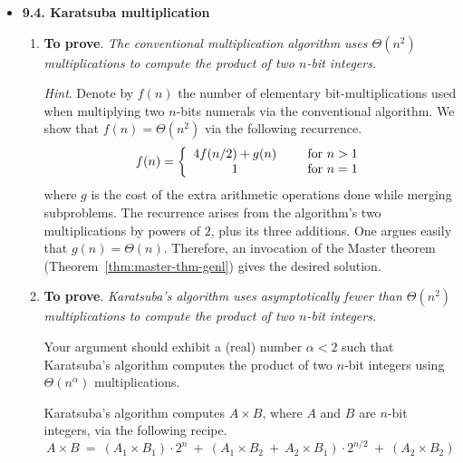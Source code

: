 \begin{itemize}
\item
{\bf 9.4. Karatsuba multiplication} 

\smallskip

\begin{enumerate}
\item 
{\bf To prove}.
{\em The conventional multiplication algorithm uses $\Theta(n^2)$ multiplications to compute the product of two $n$-bit integers.}

\medskip

{\em Hint}.  Denote by $f(n)$ the number of elementary bit-multiplications used when multiplying two $n$-bits numerals via the conventional algorithm.  We show that $f(n) = \Theta(n^2)$ via the following recurrence.
\[ f(n) = \left\{
\begin{array}{cl}
4 f(n/2) + g(n) & \hspace*{.2in} \mbox{for } n > 1 \\
                    1 & \hspace*{.2in} \mbox{for } n = 1
\end{array}
\right. \]
where $g$ is the cost of the extra arithmetic operations done while merging subproblems.  The recurrence arises from the algorithm's two multiplications by powers of $2$, plus its three additions.  One argues easily that $g(n) = \Theta(n)$.  Therefore, an invocation of the Master theorem (Theorem~\ref{thm:master-thm-genl}) gives the desired solution. 

\medskip\item
{\bf To prove}.
{\em Karatsuba's algorithm uses {\em asymptotically fewer than} $\Theta(n^2)$ multiplications to compute the product of two $n$-bit integers.}

\smallskip

Your argument should exhibit a (real) number $\alpha < 2$ such that Karatsuba's algorithm computes the product of two $n$-bit integers using $\Theta(n^\alpha)$ multiplications.

\medskip

Karatsuba's algorithm computes $A \times B$, where $A$ and $B$ are $n$-bit integers, via the following recipe.
\begin{equation}
\label{eq:karatsuba-normal}
A \times B \ = \ (A_1 \times B_1) \cdot 2^n \ + \  (A_1 \times B_2 \ + \ A_2 \times B_1) \cdot 2^{n/2} \ + \ (A_2 \times B_2)
\end{equation}

\smallskip


\end{enumerate}
\end{itemize}
